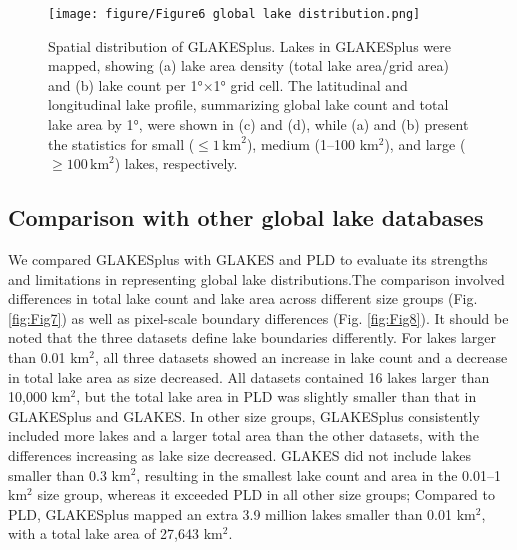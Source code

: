 \documentclass[preprint,12pt,authoryear]{elsarticle}
\begin{document}
\begin{figure}[h]
    \centering
    \texttt{[image: figure/Figure6 global lake distribution.png]}
    \caption{Spatial distribution of GLAKESplus. Lakes in GLAKESplus were mapped, showing (a) lake area density (total lake area/grid area) and (b) lake count per 1°×1° grid cell. The latitudinal and longitudinal lake profile, summarizing global lake count and total lake area by 1°, were shown in (c) and (d), while (a) and (b) present the statistics for small ($\le 1 \,\text{km}^2$), medium (1–100 km$^2$), and large ($\ge 100 \,\text{km}^2$) lakes, respectively.}
    \label{fig:Fig6}
\end{figure}

\subsection{Comparison with other global lake databases}
\label{subsec33}

We compared GLAKESplus with GLAKES and PLD to evaluate its strengths and limitations in representing global lake distributions.The comparison involved differences in total lake count and  lake area across different size groups (Fig. \ref{fig:Fig7}) as well as pixel-scale boundary differences (Fig. \ref{fig:Fig8}). It should be noted that the three datasets define lake boundaries differently. For lakes larger than 0.01 km$^2$, all three datasets showed an increase in lake count and a decrease in total lake area as size decreased. All datasets contained 16 lakes larger than 10,000 km$^2$, but the total lake area in PLD was slightly smaller than that in GLAKESplus and GLAKES. In other size groups, GLAKESplus consistently included more lakes and a larger total area than the other datasets, with the differences increasing as lake size decreased. GLAKES did not include lakes smaller than 0.3 km$^2$, resulting in the smallest lake count and area in the 0.01–1 km$^2$ size group, whereas it exceeded PLD in all other size groups; Compared to PLD, GLAKESplus mapped an extra 3.9 million lakes smaller than 0.01 km$^2$, with a total lake area of 27,643 km$^2$. 
\end{document}
